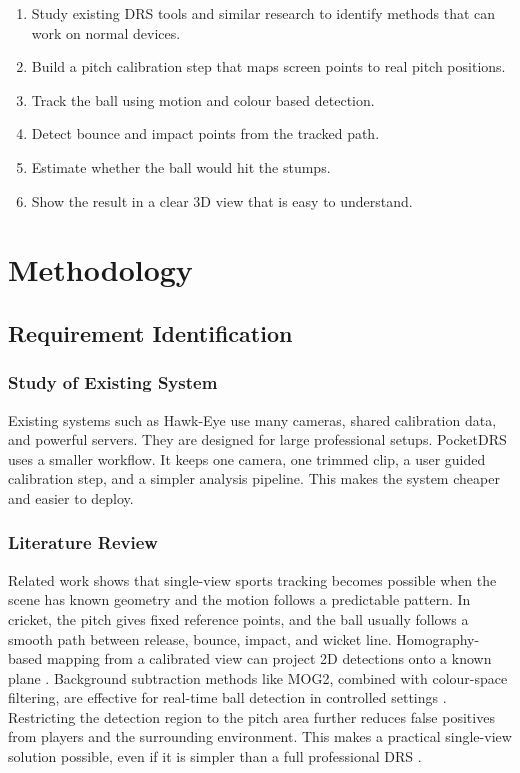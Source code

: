 \documentclass[12pt,a4paper]{article}
\begin{document}
\begin{enumerate}
    \item Study existing DRS tools and similar research to identify methods that can work on normal devices.
    \item Build a pitch calibration step that maps screen points to real pitch positions.
    \item Track the ball using motion and colour based detection.
    \item Detect bounce and impact points from the tracked path.
    \item Estimate whether the ball would hit the stumps.
    \item Show the result in a clear 3D view that is easy to understand.
\end{enumerate}

\section{Methodology}

\subsection{Requirement Identification}

\subsubsection{Study of Existing System}

Existing systems such as Hawk-Eye use many cameras, shared calibration data, and powerful servers. They are designed for large professional setups. PocketDRS uses a smaller workflow. It keeps one camera, one trimmed clip, a user guided calibration step, and a simpler analysis pipeline. This makes the system cheaper and easier to deploy.

\subsubsection{Literature Review}

Related work shows that single-view sports tracking becomes possible when the scene has known geometry and the motion follows a predictable pattern. In cricket, the pitch gives fixed reference points, and the ball usually follows a smooth path between release, bounce, impact, and wicket line. Homography-based mapping from a calibrated view can project 2D detections onto a known plane \cite{zhang2000}. Background subtraction methods like MOG2, combined with colour-space filtering, are effective for real-time ball detection in controlled settings \cite{opencv2024}. Restricting the detection region to the pitch area further reduces false positives from players and the surrounding environment. This makes a practical single-view solution possible, even if it is simpler than a full professional DRS \cite{ponglertnapakorn2021}.
\end{document}
